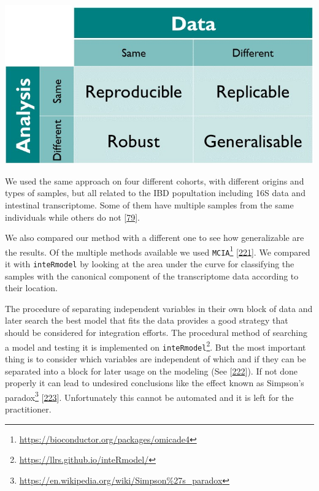 \documentclass[
  12pt,
  a4paper,
  twoside,
  openright]{book}
\DeclareRobustCommand{\href}[2]{#2\footnote{\url{#1}}}
\let\origfigure\figure
\let\endorigfigure\endfigure
\renewenvironment{figure}[1][2] {
    \expandafter\origfigure\expandafter[!htp]
} {
    \endorigfigure
}
\begin{document}
\begin{figure}
\includegraphics[width=1\linewidth]{images/turing_way_reproducible-matrix} \caption[Reproducibility matrix]{Reproducibility matrix indicating the terminology used between using the same method and the same data. Figure from The Turing Way: A Handbook for Reproducible Data Science (Version v1.0.1).}\label{fig:reproducible-matrix}
\end{figure}

We used the same approach on four different cohorts, with different origins and types of samples, but all related to the IBD popultation including 16S data and intestinal transcriptome.
Some of them have multiple samples from the same individuals while others do not {[}\protect\hyperlink{ref-hasler_uncoupling_2016}{79}{]}.

We also compared our method with a different one to see how generalizable are the results.
Of the multiple methods available we used \href{https://bioconductor.org/packages/omicade4}{\texttt{MCIA}} {[}\protect\hyperlink{ref-mengMultivariateApproachIntegration2014}{221}{]}.
We compared it with \texttt{inteRmodel} by looking at the area under the curve for classifying the samples with the canonical component of the transcriptome data according to their location.

The procedure of separating independent variables in their own block of data and later search the best model that fits the data provides a good strategy that should be considered for integration efforts.
The procedural method of searching a model and testing it is implemented on \href{https://llrs.github.io/inteRmodel/}{\texttt{inteRmodel}}.
But the most important thing is to consider which variables are independent of which and if they can be separated into a block for later usage on the modeling (See {[}\protect\hyperlink{ref-pearl2011}{222}{]}).
If not done properly it can lead to undesired conclusions like the effect known as \href{https://en.wikipedia.org/wiki/Simpson\%27s_paradox}{Simpson's paradox} {[}\protect\hyperlink{ref-simpson1951}{223}{]}.
Unfortunately this cannot be automated and it is left for the practitioner.
\end{document}
